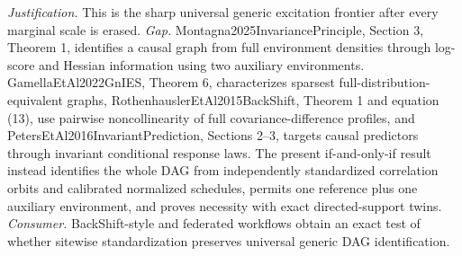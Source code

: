 \documentclass{article}
\begin{document}
\par\smallskip\noindent \textit{Justification.} This is the sharp universal generic excitation frontier after every marginal scale is erased. \textit{Gap.} Montagna2025InvariancePrinciple, Section 3, Theorem 1, identifies a causal graph from full environment densities through log-score and Hessian information using two auxiliary environments. GamellaEtAl2022GnIES, Theorem 6, characterizes sparsest full-distribution-equivalent graphs, RothenhauslerEtAl2015BackShift, Theorem 1 and equation (13), use pairwise noncollinearity of full covariance-difference profiles, and PetersEtAl2016InvariantPrediction, Sections 2--3, targets causal predictors through invariant conditional response laws. The present if-and-only-if result instead identifies the whole DAG from independently standardized correlation orbits and calibrated normalized schedules, permits one reference plus one auxiliary environment, and proves necessity with exact directed-support twins. \textit{Consumer.} BackShift-style and federated workflows obtain an exact test of whether sitewise standardization preserves universal generic DAG identification.
\end{document}
